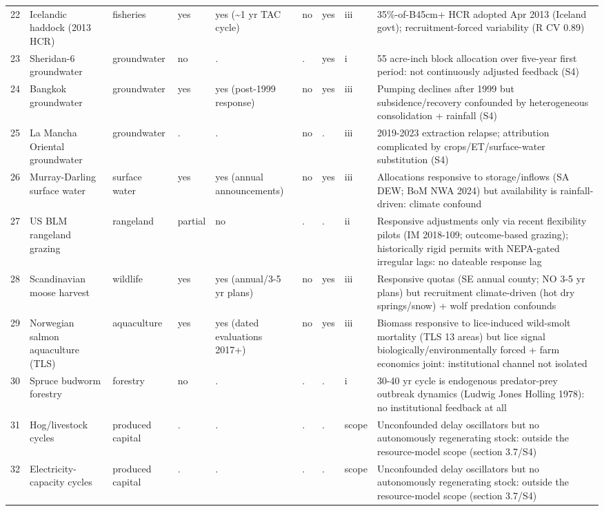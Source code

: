 \begin{landscape}
\begin{longtable}{@{}p{0.55cm}p{3.3cm}p{1.6cm}p{1.0cm}p{1.6cm}p{1.05cm}p{1.0cm}p{1.0cm}p{10.8cm}@{}}
22 & Icelandic haddock (2013 HCR) & fisheries & yes & yes (\textasciitilde{}1 yr TAC cycle) & no & yes & iii & 35\%-of-B45cm+ HCR adopted Apr 2013 (Iceland govt); recruitment-forced variability (R CV 0.89) \\
23 & Sheridan-6 groundwater & groundwater & no & .  & .  & yes & i & 55 acre-inch block allocation over five-year first period: not continuously adjusted feedback (S4) \\
24 & Bangkok groundwater & groundwater & yes & yes (post-1999 response) & no & yes & iii & Pumping declines after 1999 but subsidence/recovery confounded by heterogeneous consolidation + rainfall (S4) \\
25 & La Mancha Oriental groundwater & groundwater & . & . & no & . & iii & 2019-2023 extraction relapse; attribution complicated by crops/ET/surface-water substitution (S4) \\
26 & Murray-Darling surface water & surface water & yes & yes (annual announcements) & no & yes & iii & Allocations responsive to storage/inflows (SA DEW; BoM NWA 2024) but availability is rainfall-driven: climate confound \\
27 & US BLM rangeland grazing & rangeland & partial & no & .  & . & ii & Responsive adjustments only via recent flexibility pilots (IM 2018-109; outcome-based grazing); historically rigid permits with NEPA-gated irregular lags: no dateable response lag \\
28 & Scandinavian moose harvest & wildlife & yes & yes (annual/3-5 yr plans) & no & yes & iii & Responsive quotas (SE annual county; NO 3-5 yr plans) but recruitment climate-driven (hot dry springs/snow) + wolf predation confounds \\
29 & Norwegian salmon aquaculture (TLS) & aquaculture & yes & yes (dated evaluations 2017+) & no & yes & iii & Biomass responsive to lice-induced wild-smolt mortality (TLS 13 areas) but lice signal biologically/environmentally forced + farm economics joint: institutional channel not isolated \\
30 & Spruce budworm forestry & forestry & no & .  & .  & . & i & 30-40 yr cycle is endogenous predator-prey outbreak dynamics (Ludwig Jones Holling 1978): no institutional feedback at all \\
31 & Hog\allowbreak/livestock cycles & produced capital & . & . & . & . & scope & Unconfounded delay oscillators but no autonomously regenerating stock: outside the resource-model scope (section 3.7/S4) \\
32 & Electricity-capacity cycles & produced capital & . & . & . & . & scope & Unconfounded delay oscillators but no autonomously regenerating stock: outside the resource-model scope (section 3.7/S4) \\
\end{longtable}
\end{landscape}
